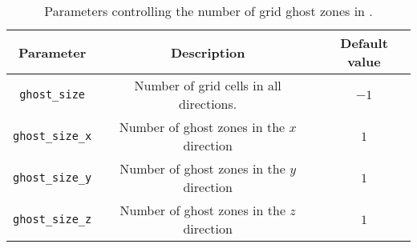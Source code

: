 \begin{table}[ht]
  \centering
  \begin{tabular}{ccc}
  Parameter             & Description                                & Default value \\\hline\hline
  \texttt{ghost\_size}    & Number of grid cells in all directions.    & $-1$          \\
  \texttt{ghost\_size\_x} & Number of ghost zones in the $x$ direction & $1$           \\
  \texttt{ghost\_size\_y} & Number of ghost zones in the $y$ direction & $1$           \\
  \texttt{ghost\_size\_z} & Number of ghost zones in the $z$ direction & $1$           \\\hline\hline
  \end{tabular}
  \caption{Parameters controlling the number of grid ghost zones in \CarpetX.}
  \label{tab:ghost_sizes}
\end{table}

